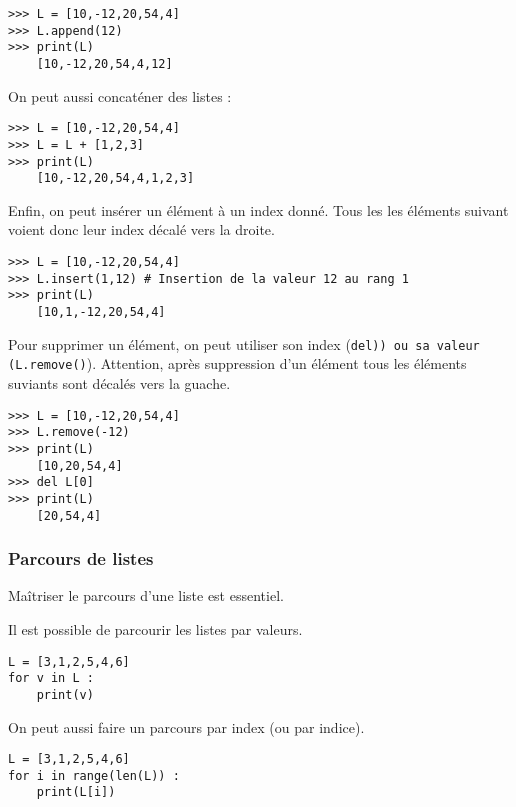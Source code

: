 \begin{lstlisting}
>>> L = [10,-12,20,54,4]
>>> L.append(12)
>>> print(L)
    [10,-12,20,54,4,12]
\end{lstlisting}

On peut aussi concaténer des listes :
\begin{lstlisting}
>>> L = [10,-12,20,54,4]
>>> L = L + [1,2,3]
>>> print(L)
    [10,-12,20,54,4,1,2,3]
\end{lstlisting}


Enfin, on peut insérer un élément à un index donné. Tous les les éléments suivant voient donc leur index décalé vers la droite.  
\begin{lstlisting}
>>> L = [10,-12,20,54,4]
>>> L.insert(1,12) # Insertion de la valeur 12 au rang 1
>>> print(L)
    [10,1,-12,20,54,4]
\end{lstlisting}


Pour supprimer un élément, on peut utiliser son index (\lstinline(del)) ou sa valeur (\lstinline{(L.remove()}). Attention, après suppression d'un élément tous les éléments suviants sont décalés vers la guache.  
\begin{lstlisting}
>>> L = [10,-12,20,54,4]
>>> L.remove(-12)
>>> print(L)
    [10,20,54,4]
>>> del L[0]
>>> print(L)
    [20,54,4]
\end{lstlisting}


\subsubsection{Parcours de listes}

\newcommand{\heart}{\ensuremath\heartsuit}


   

Maîtriser le parcours d'une liste est essentiel.


\begin{minipage}[c]{.47\linewidth}
Il est possible de parcourir les listes par valeurs. 
\begin{lstlisting}
L = [3,1,2,5,4,6]
for v in L : 
    print(v)
\end{lstlisting}
\end{minipage}
\hfill
\begin{minipage}[c]{.47\linewidth}
On peut aussi faire un parcours par index (ou par indice).
\begin{lstlisting}
L = [3,1,2,5,4,6]
for i in range(len(L)) : 
    print(L[i])
\end{lstlisting}
\end{minipage}


